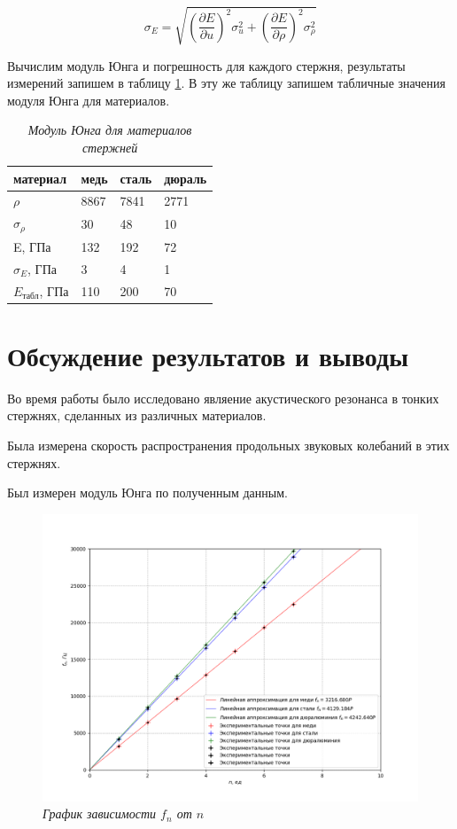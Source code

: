 \documentclass[a4paper,12pt]{article}
\begin{document}
\begin{equation}
    \sigma_E = \sqrt{
    \left ( \frac{\partial E}{\partial u} \right )^2 \sigma_{u} ^ 2 + 
    \left ( \frac{\partial E}{\partial \rho} \right )^2 \sigma_{\rho} ^ 2
    }
\end{equation}

Вычислим модуль Юнга и погрешность для каждого стержня, результаты измерений запишем в таблицу \ref{yung}. В эту же таблицу запишем табличные значения модуля Юнга для материалов.

\begin{table}[!ht]
    \centering
    \begin{tabular}{|l|l|l|l|}
    \hline
        материал & медь & сталь & дюраль \\ \hline
        $\rho$ & 8867 & 7841 & 2771 \\ \hline
        $\sigma_\rho$ & 30 & 48 & 10 \\ \hline
        E, ГПа & 132 & 192 & 72 \\ \hline
        $\sigma_E$, ГПа & 3 & 4 & 1 \\ \hline
        $E_\text{табл}$, ГПа & 110 & 200 & 70 \\ \hline
    \end{tabular}\caption{\textit{Модуль Юнга для материалов стержней}}\label{yung}
\end{table}

\section{Обсуждение результатов и выводы}

Во время работы было исследовано являение акустического резонанса в тонких стержнях, сделанных из различных материалов. 

Была измерена скорость распространения продольных звуковых колебаний в этих стержнях.

Был измерен модуль Юнга по полученным данным.

\begin{figure}[h!]
        \centering
	\includegraphics[width=1.1\textwidth]{graph.png}
	\caption{\textit{График зависимости $f_n$ от $n$}}
	\label{graph}
\end{figure}
\end{document}

